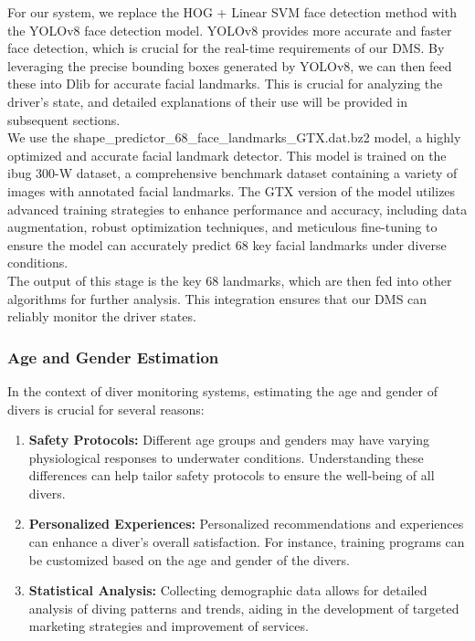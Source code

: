 For our system, we replace the HOG + Linear SVM face detection method with the YOLOv8 face detection model. YOLOv8 provides more accurate and faster face detection, which is crucial for the real-time requirements of our DMS. By leveraging the precise bounding boxes generated by YOLOv8, we can then feed these into Dlib for accurate facial landmarks. This is crucial for analyzing the driver's state, and detailed explanations of their use will be provided in subsequent sections.\\

We use the shape\_predictor\_68\_face\_landmarks\_GTX.dat.bz2 model, a highly optimized and accurate facial landmark detector. This model is trained on the ibug 300-W dataset, a comprehensive benchmark dataset containing a variety of images with annotated facial landmarks. The GTX version of the model utilizes advanced training strategies to enhance performance and accuracy, including data augmentation, robust optimization techniques, and meticulous fine-tuning to ensure the model can accurately predict 68 key facial landmarks under diverse conditions.\\

The output of this stage is the key 68 landmarks, which are then fed into other algorithms for further analysis. This integration ensures that our DMS can reliably monitor the driver states.

\subsubsection{Age and Gender Estimation}

In the context of diver monitoring systems, estimating the age and gender of divers is crucial for several reasons:

\begin{enumerate}
    \item \textbf{Safety Protocols:} Different age groups and genders may have varying physiological responses to underwater conditions. Understanding these differences can help tailor safety protocols to ensure the well-being of all divers.
\item \textbf{Personalized Experiences: }Personalized recommendations and experiences can enhance a diver's overall satisfaction. For instance, training programs can be customized based on the age and gender of the divers.
\item \textbf{Statistical Analysis:} Collecting demographic data allows for detailed analysis of diving patterns and trends, aiding in the development of targeted marketing strategies and improvement of services.
\end{enumerate}


